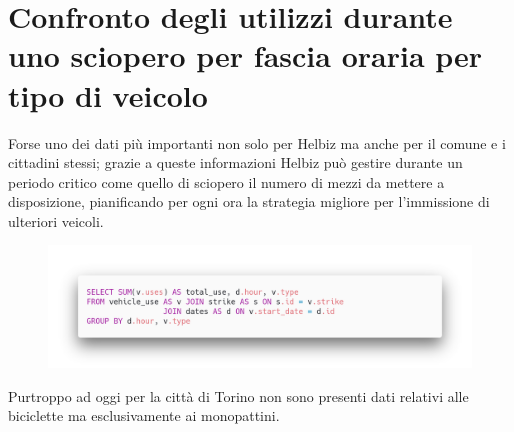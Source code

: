 \section{Confronto degli utilizzi durante uno sciopero per fascia oraria per tipo di veicolo}
Forse uno dei dati più importanti non solo per Helbiz ma anche per il comune e 
i cittadini stessi; grazie a queste informazioni Helbiz può gestire durante 
un periodo critico come quello di sciopero il numero di mezzi da mettere a disposizione,
pianificando per ogni ora la strategia migliore per l'immissione di ulteriori veicoli.
\begin{figure}[H]                                                                                                                                                            
\centering                                                                                                                                                                   
\includegraphics[width=\textwidth]{images/query3}                                                                                                                                   
\label{fig:query3}                                                                                                                                                           
\end{figure}

Purtroppo ad oggi per la città di Torino non sono presenti dati relativi alle
biciclette ma esclusivamente ai monopattini.

